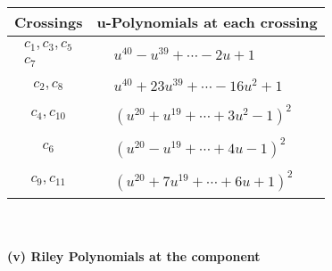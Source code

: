 \documentclass[1p]{elsarticle_modified}
\theoremstyle{definition}
\begin{document}
\begin{tabular}{m{50pt}|m{274pt}}
Crossings & \hspace{64pt}u-Polynomials at each crossing \\
\hline $$\begin{aligned}c_{1},c_{3},c_{5}\\c_{7}\end{aligned}$$&$\begin{aligned}
&u^{40}- u^{39}+\cdots-2 u+1
\end{aligned}$\\
\hline $$\begin{aligned}c_{2},c_{8}\end{aligned}$$&$\begin{aligned}
&u^{40}+23 u^{39}+\cdots-16 u^2+1
\end{aligned}$\\
\hline $$\begin{aligned}c_{4},c_{10}\end{aligned}$$&$\begin{aligned}
&(u^{20}+u^{19}+\cdots+3 u^2-1)^{2}
\end{aligned}$\\
\hline $$\begin{aligned}c_{6}\end{aligned}$$&$\begin{aligned}
&(u^{20}- u^{19}+\cdots+4 u-1)^{2}
\end{aligned}$\\
\hline $$\begin{aligned}c_{9},c_{11}\end{aligned}$$&$\begin{aligned}
&(u^{20}+7 u^{19}+\cdots+6 u+1)^{2}
\end{aligned}$\\
\hline
\end{tabular}\\~\\
\newpage\renewcommand{\arraystretch}{1}
\flushleft \textbf{(v) Riley Polynomials at the component}\newline \\
\end{document}
